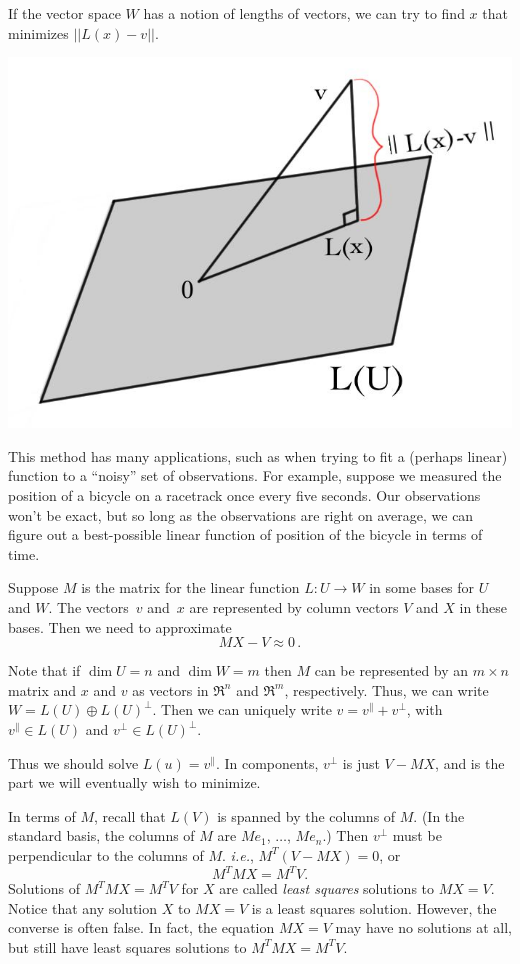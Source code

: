 If the vector space $W$ has a notion of lengths of vectors, we can try to find $x$ that minimizes $||L(x)-v||$.
\begin{center}
\includegraphics[scale=.24]{minimize.jpg}
\end{center} 
This method has many applications, such as when trying to fit a (perhaps linear) function to a ``noisy'' set of observations.  For example, suppose we measured the position of a bicycle on a racetrack once every five seconds.  Our observations won't be exact, but so long as the observations are right on average, we can figure out a best-possible linear function of position of the bicycle in terms of time.

Suppose $M$ is the matrix for the linear function $L:U \to W$ in some bases for $U$ and $W$. The vectors~$v$ and~$x$ are represented by column vectors $V$ and $X$ in these bases.  Then we need to approximate
\[
MX-V\approx 0\, .
\]

Note that if $\dim U=n$ and $\dim W=m$ then $M$ can be represented by an $m\times n$ matrix and $x$ and $v$ as vectors in $\Re^n$ and $\Re^m$, respectively. Thus, we can write $W=L(U)\oplus L(U)^\perp$.  Then we can uniquely write $v=v^\parallel + v^\perp$, with $v^\parallel \in L(U)$ and $v^\perp \in L(U)^\perp$.  



Thus we should solve $L(u)=v^\parallel$.  In components, $v^\perp$ is just $V-MX$, and is the part we will eventually wish to minimize.  

In terms of $M$, recall that $L(V)$ is spanned by the columns of $M$.  (In the standard basis, the columns of $M$ are $Me_1$, 
$\ldots$, $Me_n$.)  Then $v^\perp$ must be perpendicular to the columns of $M$.  \textit{i.e.}, $M^T(V-MX)=0$, or
\[
M^TMX = M^TV.
\]
Solutions of $M^TMX = M^TV$ for $X$ are called \emph{least squares} solutions to $MX=V$.  
Notice that any solution $X$ to $MX=V$ is a least squares solution.  However, the converse is often false.  In fact, the equation $MX=V$ may have no solutions at all, but still have least squares solutions to $M^TMX = M^TV$.

